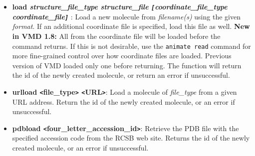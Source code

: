 \begin{itemize}
    \item {\bf load {\it structure\_file\_type}
{\it structure\_file} {\it {\tt [}coordinate\_file\_type coordinate\_file{\tt ]}}
}: 
Load a new molecule from {\it filename(s)} using the given {\it format}.
If an additional coordinate file is specified, load this file as well.
{\bf New in VMD 1.8:} All \timesteps from the coordinate file will
be loaded before the command returns.  If this is not desirable, use
the {\tt animate read} command for more fine-grained control over how
coordinate files are loaded.  Previous version of VMD loaded only one
\timestep before returning.  The function will return the id of the newly
created molecule, or return an error if unsuccessful.

    \item {\bf urlload {\tt <}file\_type{\tt >} {\tt <}URL{\tt >}}: Load a 
molecule of {\it file\_type} from a given URL address.  Return the id of
the newly created molecule, or an error if unsuccessful.

    \item {\bf pdbload {\tt <}four\_letter\_accession\_id{\tt >}}: Retrieve
the PDB file with the specified accession code from the RCSB web site.  Returns
the id of the newly created molecule, or an error if unsuccessful.


\end{itemize}
